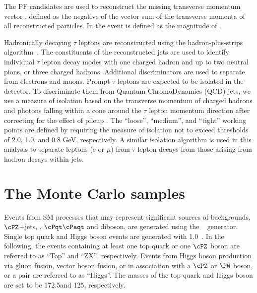 The PF candidates are used to reconstruct the missing transverse momentum  vector \ptvecmiss, defined as the negative of the vector sum of the transverse momenta of all reconstructed particles.  
In the event \MPT is defined as the magnitude of \ptvecmiss.

Hadronically decaying $\tau$ leptons are reconstructed using the hadron-plus-strips algorithm~\cite{Khachatryan:2015dfa}.
The constituents of the reconstructed jets are used to identify individual $\tau$ lepton decay modes with one charged 
hadron and up to two neutral pions, or three charged hadrons. 
Additional discriminators are used to separate \Tau from electrons and muons.
Prompt $\tau$ leptons are expected to be isolated in the detector.
To discriminate them from Quantum ChromoDynamics (QCD) jets, we use a measure of isolation 
based on the transverse momentum of charged hadrons and photons falling within 
a cone around the $\tau$ lepton momentum direction after correcting for the effect of
pileup \cite{Khachatryan:2014wca}. The ``loose'', ``medium'', and ``tight'' working points are defined
by requiring the measure of isolation not to exceed thresholds of 2.0, 1.0,
and 0.8 GeV, respectively.
 A similar isolation algorithm is 
used in this analysis to separate leptons (e or $\mu$) from $\tau$ lepton decays from 
those arising from hadron decays within jets.

\section{The Monte Carlo samples}
\label{sect:MCSamples}
Events from SM processes that may represent significant sources of backgrounds, $\cPZ$+jets, \wjets, $\cPqt\cPaqt$ and diboson, 
are generated using the ~\cite{Alwall:2011uj} generator. 
Single top quark and Higgs boson events are generated with {\POWHEG} 1.0~\cite{Nason:2004rx,Frixione:2007vw,Alioli:2009je,Alioli:2010xd}.
In the following, the events containing at least one top quark or one $\cPZ$ boson are referred to as ``Top'' and ``ZX'', respectively. 
Events from Higgs boson production via gluon fusion, vector boson fusion, or in association with a $\cPZ$ or $\PW$ boson, or a \ttbar pair are referred to as ``Higgs''. The masses of the top quark and Higgs boson are set to be 172.5\GeV and 125\GeV, respectively.

